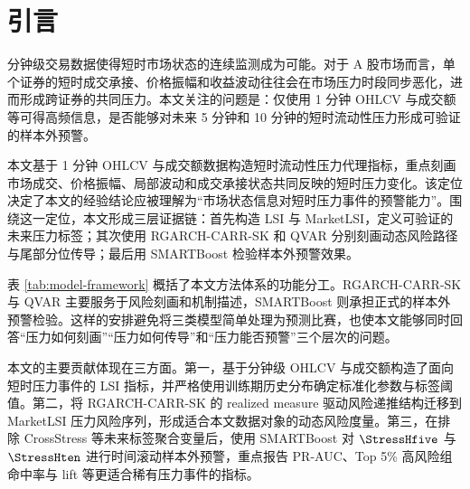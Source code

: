 \section{引言}

分钟级交易数据使得短时市场状态的连续监测成为可能。对于 A 股市场而言，单个证券的短时成交承接、价格振幅和收益波动往往会在市场压力时段同步恶化，进而形成跨证券的共同压力。本文关注的问题是：仅使用 1 分钟 OHLCV 与成交额等可得高频信息，是否能够对未来 5 分钟和 10 分钟的短时流动性压力形成可验证的样本外预警。

本文基于 1 分钟 OHLCV 与成交额数据构造短时流动性压力代理指标，重点刻画市场成交、价格振幅、局部波动和成交承接状态共同反映的短时压力变化。该定位决定了本文的经验结论应被理解为“市场状态信息对短时压力事件的预警能力”。围绕这一定位，本文形成三层证据链：首先构造 LSI 与 MarketLSI，定义可验证的未来压力标签；其次使用 RGARCH-CARR-SK 和 QVAR 分别刻画动态风险路径与尾部分位传导；最后用 SMARTBoost 检验样本外预警效果。



表 \ref{tab:model-framework} 概括了本文方法体系的功能分工。RGARCH-CARR-SK 与 QVAR 主要服务于风险刻画和机制描述，SMARTBoost 则承担正式的样本外预警检验。这样的安排避免将三类模型简单处理为预测比赛，也使本文能够同时回答“压力如何刻画”“压力如何传导”和“压力能否预警”三个层次的问题。

本文的主要贡献体现在三方面。第一，基于分钟级 OHLCV 与成交额构造了面向短时压力事件的 LSI 指标，并严格使用训练期历史分布确定标准化参数与标签阈值。第二，将 RGARCH-CARR-SK 的 realized measure 驱动风险递推结构迁移到 MarketLSI 压力风险序列，形成适合本文数据对象的动态风险度量。第三，在排除 CrossStress 等未来标签聚合变量后，使用 SMARTBoost 对 \(\StressHfive\) 与 \(\StressHten\) 进行时间滚动样本外预警，重点报告 PR-AUC、Top 5\% 高风险组命中率与 lift 等更适合稀有压力事件的指标。
